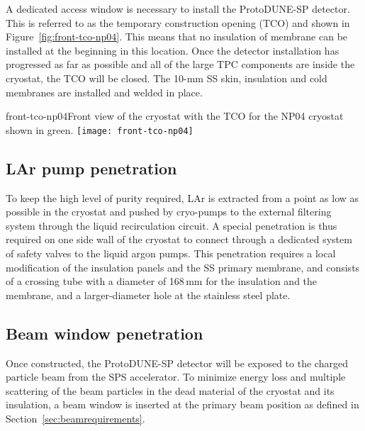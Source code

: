 A dedicated access window is necessary to install the ProtoDUNE-SP detector.  This is referred to as the temporary construction opening (TCO) and shown in Figure~\ref{fig:front-tco-np04}.  This means that no insulation of membrane can be installed at the beginning in this location. Once the detector installation has progressed as far as possible and all of the large TPC components are inside the cryostat, the TCO will be closed.  The 10-mm SS skin, insulation and cold membranes are installed and welded in place. 

\begin{cdrfigure}{front-tco-np04}{Front view of the cryostat with the TCO for the NP04 cryostat shown in green.}
  \texttt{[image: front-tco-np04]}
\end{cdrfigure}


\subsection{LAr pump penetration}

To keep the high level of purity required, LAr is extracted from a point as low as possible in the cryostat and pushed by cryo-pumps 
to the external filtering system through the liquid recirculation circuit. A special penetration is thus 
required on one side wall of the cryostat to connect through a dedicated system of safety valves to the liquid argon pumps.
This penetration requires a local modification of the insulation panels and the SS primary membrane, and consists of a crossing tube with a diameter of 168\,mm for the insulation and the membrane, and a larger-diameter hole at the stainless steel plate.

\subsection{Beam window penetration}
\label{subsec:beamwindow}
Once constructed, the ProtoDUNE-SP detector will be exposed to the charged
particle beam from the SPS accelerator. To minimize energy loss and
multiple scattering of the beam particles in the dead material of the
cryostat and its insulation, a beam window is inserted at the primary beam position as defined  in Section~\ref{sec:beamrequirements}. 

